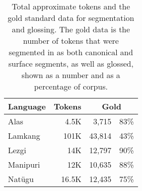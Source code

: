 \begin{table}[t]
    \centering
    \begin{tabular}{l|r|rc}
         \textbf{Language} & \textbf{Tokens} & \multicolumn{2}{c}{\textbf{Gold}} \\
         \hline
         Alas & 4.5K & 3,715 & 83\%  \\
         \hline
         Lamkang & 101K & 43,814 & 43\% \\
         \hline
         Lezgi & 14K & 12,797  &  90\% \\
         \hline
         Manipuri & 12K & 10,635 & 88\% \\
         \hline
         Natügu & 16.5K & 12,435 &  75\%  \\
    \end{tabular}
    \caption[Both Segmentation Strategies Corpora]{Total approximate tokens and the gold standard data for segmentation and glossing. The gold data is the number of tokens that were segmented in as both canonical and surface segments, as well as glossed, shown as a number and as a percentage of corpus.}
    \label{tab:BothSegs}
\end{table}

